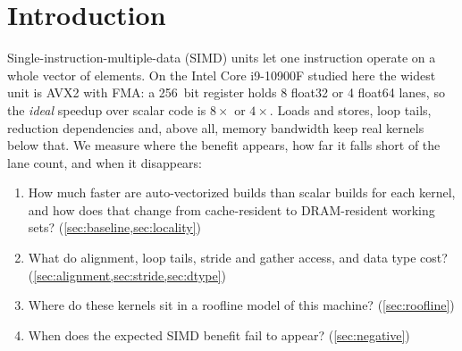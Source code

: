 \section{Introduction}\label{sec:intro}

Single-instruction-multiple-data (SIMD) units let one instruction operate on a whole vector of
elements. On the Intel Core i9-10900F studied here the widest unit is AVX2 with FMA: a
\qty{256}{bit} register holds \num{8} float32 or \num{4} float64 lanes, so the \emph{ideal} speedup
over scalar code is $8\times$ or $4\times$. Loads and stores, loop tails, reduction dependencies
and, above all, memory bandwidth keep real kernels below that. We measure where the benefit
appears, how far it falls short of the lane count, and when it disappears:
\begin{enumerate}
  \item How much faster are auto-vectorized builds than scalar builds for each kernel, and how does
        that change from cache-resident to DRAM-resident working sets? (\cref{sec:baseline,sec:locality})
  \item What do alignment, loop tails, stride and gather access, and data type cost? (\cref{sec:alignment,sec:stride,sec:dtype})
  \item Where do these kernels sit in a roofline model of this machine? (\cref{sec:roofline})
  \item When does the expected SIMD benefit fail to appear? (\cref{sec:negative})
\end{enumerate}
